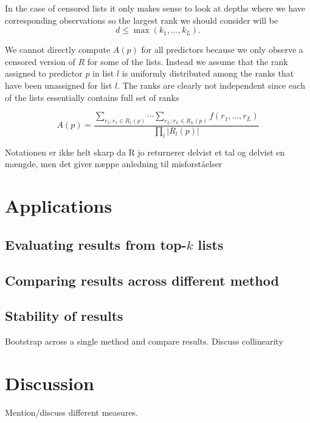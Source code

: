 \documentclass[12pt,a4paper]{article}\usepackage[]{graphicx}\usepackage[]{color}
\begin{document}
In the case of censored lists it only makes sense to look at depths where we have corresponding observations so the largest rank we should consider will be 
\begin{equation}
d \leq \max(k_1, \ldots, k_L).
\end{equation}

We cannot directly compute $A(p)$ for all predictors because we only observe a censored version of $R$ for some of the lists. Instead we assume that the rank assigned to predictor $p$ in list $l$ is uniformly distributed among the ranks that have been unassigned for list $l$. The ranks are clearly not independent since each of the lists essentially contains full set of ranks 

\begin{equation}
A(p) = \frac{\sum_{r_1; r_1\in R_1(p)}  \cdots \sum_{r_L; r_L\in R_L(p)} f(r_1, \ldots, r_L)}{\prod_l |R_l(p)|}
\end{equation}

Notationen er ikke helt skarp da R jo returnerer delvist et tal og delvist en mængde, men det giver næppe anledning til misforståelser

\section{Applications}

\subsection{Evaluating results from top-$k$ lists}

\subsection{Comparing results across different method}

\subsection{Stability of results}

Bootstrap across a single method and compare results. Discuss collinearity

\section{Discussion}

Mention/discuss different measures. 
\end{document}

